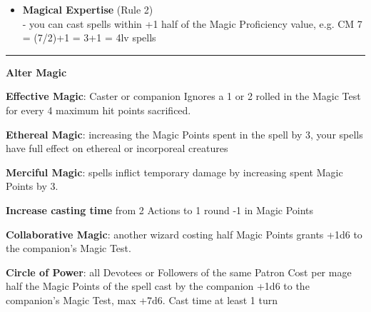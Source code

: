 \documentclass[a4paper,12 pt,openany]{book}
\newcommand{\linex}{\rule{\textwidth}{0.4pt}}
\begin{document}
\begin{textblock*}{13.5cm}
\begin{itemize}
\item
\textbf{Magical Expertise} (Rule 2)\\
- you can cast spells within +1 half of the Magic Proficiency value, e.g. CM 7 = (7/2)+1 = 3+1 = 4lv spells

\end{itemize}

\linex

\textbf{Alter Magic}

\textbf{Effective Magic}: Caster or companion Ignores a 1 or 2 rolled in the Magic Test for every 4 maximum hit points sacrificed.

\textbf{Ethereal Magic}: increasing the Magic Points spent in the spell by 3, your spells have full effect on ethereal or incorporeal creatures

\textbf{Merciful Magic}: spells inflict temporary damage by increasing spent Magic Points by 3.

\textbf{Increase casting time} from 2 Actions to 1 round -1 in Magic Points

\textbf{Collaborative Magic}: another wizard costing half Magic Points grants +1d6 to the companion's Magic Test.

\textbf{Circle of Power}: all Devotees or Followers of the same Patron
Cost per mage half the Magic Points of the spell cast by the companion +1d6 to the companion's Magic Test, max +7d6. Cast time at least 1 turn
\end{textblock*}

~\newpage
\end{document}
